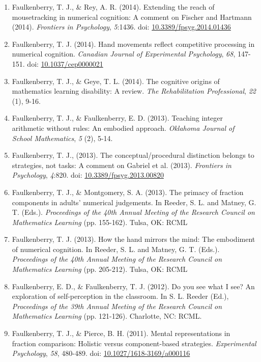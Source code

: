 \documentclass[article,10pt]{article}
\begin{document}
\begin{enumerate}
\item Faulkenberry, T. J., \& Rey, A. R. (2014). Extending the reach of mousetracking in numerical cognition: A comment on Fischer and Hartmann (2014). \emph{Frontiers in Psychology}, \emph{5}:1436. doi: \href{http://dx.doi.org/10.3389/fpsyg.2014.01436}{10.3389/fpsyg.2014.01436}
\item Faulkenberry, T. J. (2014). Hand movements reflect competitive processing in numerical cognition. \emph{Canadian Journal of Experimental Psychology}, \emph{68}, 147-151. doi: \href{http://dx.doi.org/10.1037/cep0000021}{10.1037/cep0000021}
\item Faulkenberry, T. J., \& Geye, T. L. (2014). The cognitive origins of mathematics learning disability: A review. \emph{The Rehabilitation Professional}, \emph{22} (1), 9-16.
\item Faulkenberry, T. J., \& Faulkenberry, E. D. (2013). Teaching integer arithmetic without rules: An embodied approach. \emph{Oklahoma Journal of School Mathematics}, \emph{5} (2), 5-14.
\item Faulkenberry, T. J., (2013). The conceptual/procedural distinction belongs to strategies, not tasks: A comment on Gabriel et al. (2013). \emph{Frontiers in Psychology}, \emph{4}:820. doi: \href{http://dx.doi.org/10.3389/fpsyg.2013.00820}{10.3389/fpsyg.2013.00820}
\item Faulkenberry, T. J., \& Montgomery, S. A. (2013). The primacy of fraction components in adults’ numerical judgements. In Reeder, S. L. and Matney, G. T. (Eds.). \emph{Proceedings of the 40th Annual Meeting of the Research Council on Mathematics Learning} (pp. 155-162). Tulsa, OK: RCML
\item Faulkenberry, T. J. (2013). How the hand mirrors the mind: The embodiment of numerical cognition. In Reeder, S. L. and Matney, G. T. (Eds.). \emph{Proceedings of the 40th Annual Meeting of the Research Council on Mathematics Learning} (pp. 205-212). Tulsa, OK: RCML
\item Faulkenberry, E. D., \& Faulkenberry, T. J. (2012). Do you see what I see? An exploration of self-perception in the classroom. In S. L. Reeder (Ed.), \emph{Proceedings of the 39th Annual Meeting of the Research Council on Mathematics Learning} (pp. 121-126). Charlotte, NC: RCML.
\item Faulkenberry, T. J., \& Pierce, B. H. (2011). Mental representations in fraction comparison: Holistic versus component-based strategies. \emph{Experimental Psychology}, \emph{58}, 480-489. doi: \href{http://dx.doi.org/10.1027/1618-3169/a000116}{10.1027/1618-3169/a000116}

\end{enumerate}
\end{document}
